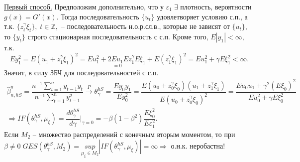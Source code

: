 \underline{Первый способ.} Предположим дополнительно, что у $\varepsilon_1 \; \exists$ плотность, вероятности $g(x) = G'(x).$ Тогда последовательность $\lbrace u_t \rbrace$ удовлетворяет условию с.п., а т.к. $\lbrace z_t^{\gamma}\xi_t \rbrace, \; t \in \mathbb{Z},$ -- последовательность н.о.р.сл.в., которые не зависят от $\lbrace u_t \rbrace$, то  $\lbrace y_t \rbrace$ строго стационарная последовательность с с.п. Кроме того, $E|y_1| < \infty, $ т.к.
$$Ey_1^2 = E(u_1 + z_1^{\gamma}\xi_1)^2 = Eu_1^2 + 2\underset{ = 0}{Eu_1}Ez_1^{\gamma}E\xi_1 + E(z_1^{\gamma}\xi_1)^2 = Eu_1^2 + \gamma E\xi_1^2 < \infty.$$
Значит, в силу ЗБЧ для последовательностей с с.п.
$$\begin{gathered}
    \hat{\beta}_{n, hS}^y = \dfrac{n^{-1}\sum\limits_{t = 1}^n y_{t - 1}y_t}{n^{-1}\sum\limits_{t = 1}^n y_{t - 1}^2} \stackrel{P}{\to} \theta_{\gamma}^{hS} = \dfrac{Ey_0y_1}{Ey_0^2} = \dfrac{E(u_0 + z_0^{\gamma}\xi_0)(u_1 + z_1^{\gamma}\xi_1)}{E(u_0 + z_0^{\gamma}\xi_0)^2} = \dfrac{Eu_0u_1 + \gamma^2 (E\xi_0)^2}{Eu_0^2 + \gamma E\xi_0^2}\\
    \Longrightarrow IF(\theta_{\gamma}^{hS}, \mu_{\xi}) = \dfrac{d\theta_{\gamma}^{hS}}{d\gamma}|_{\gamma = 0} = -\beta(1 - \beta^2)\dfrac{E\xi_0^2}{E\varepsilon_1^2}.
\end{gathered}$$
Если $M_2$ -- множество распределений с конечным вторым моментом, то при $\beta \neq 0 \; GES(\theta_{\gamma}^{hS}, M_2) = \underset{\mu_{\xi} \in M_2}{sup}|IF(\theta_{\gamma}^{hS}, \mu_{\xi})| = \infty \Longrightarrow $ о.н.к. неробастна!

